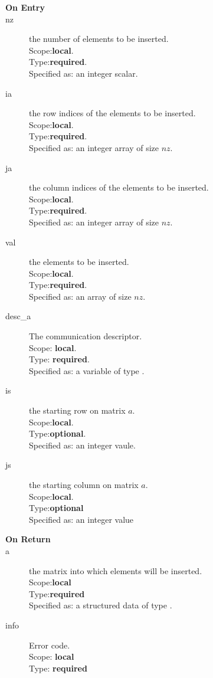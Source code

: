 \begin{description}
\item[\bf On Entry]
\item[nz] the number of elements to be inserted.\\
Scope:{\bf local}.\\
Type:{\bf required}.\\
Specified as: an integer scalar.
\item[ia] the row indices of the elements to be inserted.\\
Scope:{\bf local}.\\
Type:{\bf required}.\\
Specified as: an integer array of size $nz$.
\item[ja] the column indices of the elements to be inserted.\\
Scope:{\bf local}.\\
Type:{\bf required}.\\
Specified as: an integer array of size $nz$.
\item[val] the elements to be inserted.\\
Scope:{\bf local}.\\
Type:{\bf required}.\\
Specified as: an array of size $nz$.
\item[desc\_a] The communication descriptor.\\
Scope: {\bf local}. \\
Type: {\bf required}.\\
Specified as: a variable of type \descdata.\\
\item[is] the starting row on matrix $a$.\\
Scope:{\bf local}.\\
Type:{\bf optional}.\\
Specified as: an integer vaule.
\item[js] the starting column on matrix $a$.\\
Scope:{\bf local}.\\
Type:{\bf optional}\\
Specified as: an integer value
\end{description}

\begin{description}
\item[\bf On Return]
\item[a] the matrix into which elements will be inserted.\\
Scope:{\bf local}\\
Type:{\bf required}\\
Specified as: a structured data of type \spdata.
\item[info] Error code.\\
Scope: {\bf local} \\
Type: {\bf required}\\
\end{description}



